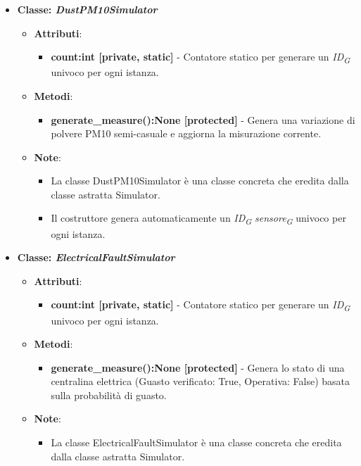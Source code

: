 \begin{itemize}
    \item{\textbf{Classe: \textit{DustPM10Simulator}}}
    \begin{itemize}
        \item   \textbf{Attributi}: 
    \begin{itemize}
        \item \textbf{count:int [private, static]} - Contatore statico per generare un \textit{ID}\textsubscript{\textit{G}} univoco per ogni istanza.
    \end{itemize}
    \item    \textbf{Metodi}: 
    \begin{itemize}
        \item \textbf{generate\_measure():None [protected]} - Genera una variazione di polvere PM10 semi-casuale e aggiorna la misurazione corrente.
    \end{itemize}
    \item    \textbf{Note}:
    \begin{itemize}
        \item La classe DustPM10Simulator è una classe concreta che eredita dalla classe astratta Simulator.
        \item Il costruttore genera automaticamente un \textit{ID}\textsubscript{\textit{G}} \textit{sensore}\textsubscript{\textit{G}} univoco per ogni istanza.
    \end{itemize}
\end{itemize}
    \item{\textbf{Classe: \textit{ElectricalFaultSimulator}}}
    \begin{itemize}
        \item   \textbf{Attributi}: 
    \begin{itemize}
        \item \textbf{count:int [private, static]} - Contatore statico per generare un \textit{ID}\textsubscript{\textit{G}} univoco per ogni istanza.
    \end{itemize}
    \item   \textbf{Metodi}: 
    \begin{itemize}
        \item \textbf{generate\_measure():None [protected]} - Genera lo stato di una centralina elettrica (Guasto verificato: True, Operativa: False) basata sulla probabilità di guasto.
    \end{itemize}
    \item   \textbf{Note}:
    \begin{itemize}
        \item La classe ElectricalFaultSimulator è una classe concreta che eredita dalla classe astratta Simulator.

\end{itemize}
\end{itemize}
\end{itemize}
